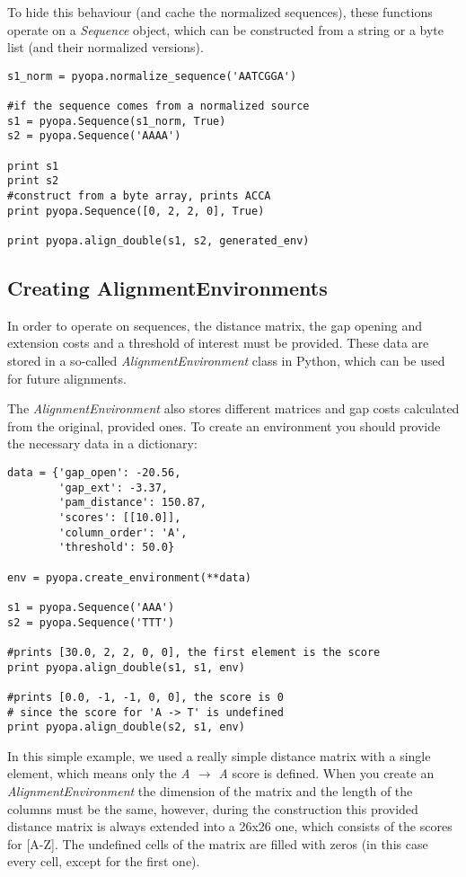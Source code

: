 \documentclass[12pt]{article}
\newcommand{\alenv}{\emph{AlignmentEnvironment}}
\begin{document}
To hide this behaviour (and cache the normalized sequences), these functions operate on a \emph{Sequence} object, which can be constructed from a string or a byte list (and their normalized versions).

\begin{lstlisting}
s1_norm = pyopa.normalize_sequence('AATCGGA')

#if the sequence comes from a normalized source
s1 = pyopa.Sequence(s1_norm, True)
s2 = pyopa.Sequence('AAAA')

print s1
print s2
#construct from a byte array, prints ACCA
print pyopa.Sequence([0, 2, 2, 0], True)

print pyopa.align_double(s1, s2, generated_env)
\end{lstlisting}


\subsection{Creating AlignmentEnvironments}
\label{subsec:createAlEnvs}
In order to operate on sequences, the distance matrix, the gap opening and extension costs and a threshold of interest must be provided. These data are stored in a so-called \alenv{} class in Python, which can be used for future alignments. 

The \alenv{} also stores different matrices and gap costs calculated from the original, provided ones. To create an environment you should provide the necessary data in a dictionary:

\begin{lstlisting}
data = {'gap_open': -20.56,
        'gap_ext': -3.37,
        'pam_distance': 150.87,
        'scores': [[10.0]],
        'column_order': 'A',
        'threshold': 50.0}

env = pyopa.create_environment(**data)

s1 = pyopa.Sequence('AAA')
s2 = pyopa.Sequence('TTT')

#prints [30.0, 2, 2, 0, 0], the first element is the score
print pyopa.align_double(s1, s1, env)

#prints [0.0, -1, -1, 0, 0], the score is 0
# since the score for 'A -> T' is undefined
print pyopa.align_double(s2, s1, env)
\end{lstlisting}

In this simple example, we used a really simple distance matrix with a single element, which means only the \emph{A $\rightarrow$ A} score is defined. When you create an \alenv{} the dimension of the matrix and the length of the columns must be the same, however, during the construction  this provided distance matrix is always extended into a 26x26 one, which consists of the scores for [A-Z]. The undefined cells of the matrix are filled with zeros (in this case every cell, except for the first one).
\end{document}
